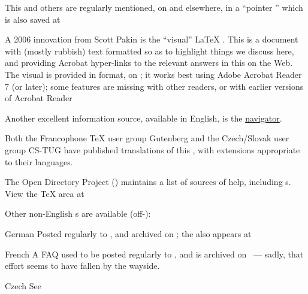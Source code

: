 This  and others are regularly mentioned, on
 and elsewhere, in a ``pointer ''
which is also saved at 

A 2006 innovation from Scott Pakin is the ``visual'' \LaTeX{} .
This is a document with (mostly rubbish) text formatted so as to
highlight things we discuss here, and providing Acrobat hyper-links to
the relevant answers in this  on the Web.  The visual
 is provided in  format, on ; it works
best using Adobe Acrobat Reader 7 (or later); some features are
missing with other readers, or with earlier versions of Acrobat Reader

Another excellent information source, available in English, is the
\href{http://tex.loria.fr}{\AllTeX{} navigator}.

Both the Francophone \TeX{} user group Gutenberg and the Czech/Slovak
user group CS-TUG have published translations of this , with
extensions appropriate to their languages.


The Open Directory Project () maintains a list of sources of
\AllTeX{} help, including s.  View the \TeX{} area at

Other non-English s are available (off-):
\begin{booklist}
\item[German]Posted regularly to , and archived
  on ; the  also appears at
\item[French]%
  A FAQ used to be posted regularly to
  , and is archived on ~---
  sadly, that effort seems to have fallen by the wayside.
\item[Czech]See 
\end{booklist}

